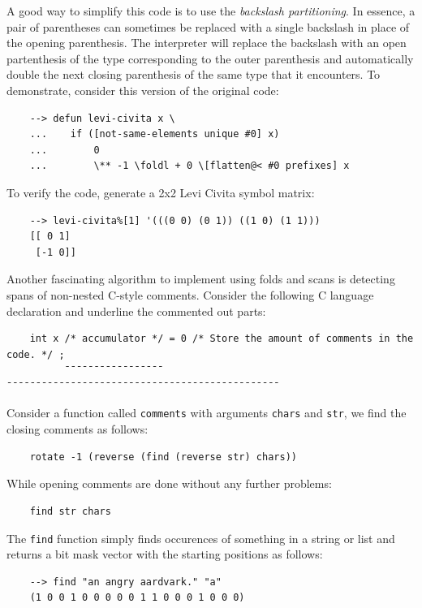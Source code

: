 A good way to simplify this code is to use the \textit{backslash partitioning}. In essence, a pair of parentheses can sometimes be replaced with a single backslash in place of the opening parenthesis. The interpreter will replace the backslash with an open partenthesis of the type corresponding to the outer parenthesis and automatically double the next closing parenthesis of the same type that it encounters. To demonstrate, consider this version of the original code:

\begin{Verbatim}
    --> defun levi-civita x \
    ...    if ([not-same-elements unique #0] x)
    ...        0
    ...        \** -1 \foldl + 0 \[flatten@< #0 prefixes] x
\end{Verbatim}

To verify the code, generate a 2x2 Levi Civita symbol matrix:

\begin{Verbatim}
    --> levi-civita%[1] '(((0 0) (0 1)) ((1 0) (1 1)))
    [[ 0 1]
     [-1 0]]
\end{Verbatim}

Another fascinating algorithm to implement using folds and scans is detecting spans of non-nested C-style comments. Consider the following C language declaration and underline the commented out parts:

\begin{Verbatim}
    int x /* accumulator */ = 0 /* Store the amount of comments in the code. */ ;
          ¯¯¯¯¯¯¯¯¯¯¯¯¯¯¯¯¯     ¯¯¯¯¯¯¯¯¯¯¯¯¯¯¯¯¯¯¯¯¯¯¯¯¯¯¯¯¯¯¯¯¯¯¯¯¯¯¯¯¯¯¯¯¯¯¯
\end{Verbatim}

Consider a function called \verb|comments| with arguments \verb|chars| and \verb|str|, we find the closing comments as follows:

\begin{Verbatim}
    rotate -1 (reverse (find (reverse str) chars))
\end{Verbatim}

While opening comments are done without any further problems:

\begin{Verbatim}
    find str chars
\end{Verbatim}

The \verb|find| function simply finds occurences of something in a string or list and returns a bit mask vector with the starting positions as follows:

\begin{Verbatim}
    --> find "an angry aardvark." "a"
    (1 0 0 1 0 0 0 0 0 1 1 0 0 0 1 0 0 0)
\end{Verbatim}

